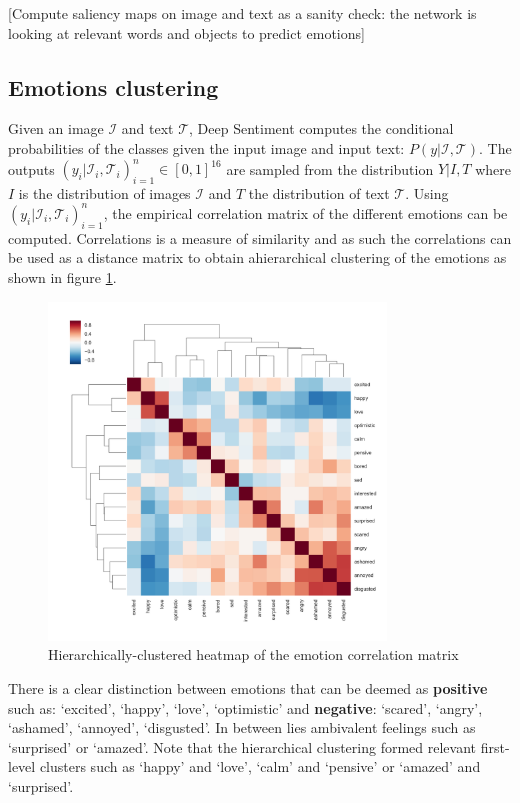 \documentclass{article} %
\begin{document}
[Compute saliency maps on image and text as a sanity check: the network is looking at relevant words and objects to predict emotions]

\subsection{Emotions clustering}
Given an image $\mathcal{I}$ and text $\mathcal{T}$, Deep Sentiment computes the conditional probabilities of the classes given the input image and input text: $P(y | \mathcal{I}, \mathcal{T})$. The outputs $(y_i | \mathcal{I}_i, \mathcal{T}_i)_{i=1}^n \in [0,1]^{16}$ are sampled from the distribution $Y| I, T$ where $I$ is the distribution of images $\mathcal{I}$ and $T$ the distribution of text $\mathcal{T}$. Using $(y_i | \mathcal{I}_i, \mathcal{T}_i)_{i=1}^n$, the empirical correlation matrix of the different emotions can be computed. Correlations is a measure of similarity and as such the correlations can be used as a distance matrix to obtain ahierarchical clustering of the emotions as shown in figure \ref{dendrogram}.

\begin{figure}[H]
    \centering
    \includegraphics[width=0.8\textwidth]{Images/dendrogram.jpg}
    \caption{Hierarchically-clustered heatmap of the emotion correlation matrix}
    \label{dendrogram}
\end{figure}

There is a clear distinction between emotions that can be deemed as \textbf{positive} such as: `excited', `happy', `love', `optimistic' and \textbf{negative}: `scared', `angry', `ashamed', `annoyed', `disgusted'. In between lies ambivalent feelings such as `surprised' or `amazed'. Note that the hierarchical clustering formed relevant first-level clusters such as `happy' and `love', `calm' and `pensive' or `amazed' and `surprised'.
\end{document}
